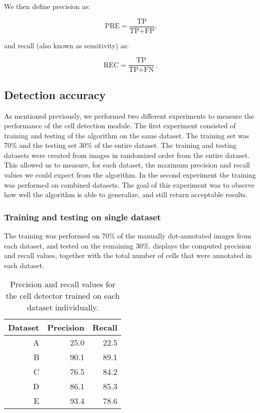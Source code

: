 	We then define precision as:
	
	\[
		\text{PRE} = \frac{\text{TP}}{\text{TP}+\text{FP}}\text{,}
	\]
	
	\noindent and recall (also known as sensitivity) as:
	
	\[
		\text{REC} = \frac{\text{TP}}{\text{TP} + \text{FN}}\ \text{.}
	\]
	
	\subsection{Detection accuracy \statusnew}
			
		As mentioned previously, we performed two different experiments to measure the performance of the cell detection module. The first experiment consisted of training and testing of the algorithm on the same dataset. The training set was 70\% and the testing set 30\% of the entire dataset. The training and testing datasets were created from images in randomized order from the entire dataset. This allowed us to measure, for each dataset, the maximum precision and recall values we could expect from the algorithm. In the second experiment the training was performed on combined datasets. The goal of this experiment was to observe how well the algorithm is able to generalize, and still return acceptable results.
		
		\subsubsection{Training and testing on single dataset}
		
		The training was performed on 70\% of the manually dot-annotated images from each dataset, and tested on the remaining 30\%.  displays the computed precision and recall values, together with the total number of cells that were annotated in each dataset.
		
		
		\begin{table}[h]
			\centering
			\begin{tabular}{rrr}
				Dataset & Precision & Recall \\
				\hline
				      A &      25.0 &   22.5 \\
				      B &      90.1 &   89.1 \\
				      C &      76.5 &   84.2 \\
				      D &      86.1 &   85.3 \\
				      E &      93.4 &   78.6
			\end{tabular} 
			\caption{Precision and recall values for the cell detector trained on each dataset individually.}
			\label{tab:results_detector_individual}
		\end{table}
		
